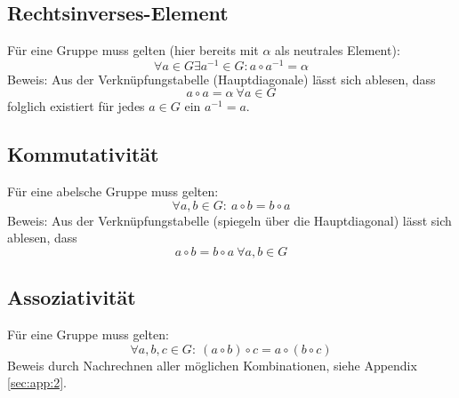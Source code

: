 \documentclass[DIN, pagenumber=false, fontsize=11pt, parskip=half]{scrartcl}
\begin{document}
    \subsection{Rechtsinverses-Element}
    Für eine Gruppe muss gelten (hier bereits mit $\alpha$ als neutrales Element):
    \begin{equation}
        \forall a \in G \exists a^{-1} \in G: a \circ a^{-1} = \alpha
    \end{equation}
    Beweis: Aus der Verknüpfungstabelle (Hauptdiagonale) lässt sich ablesen, dass 
    \begin{equation}
        a \circ a = \alpha\ \forall a \in G
    \end{equation}
    folglich existiert für jedes $a \in G$ ein $a^{-1} = a$.

    \subsection{Kommutativität}
    Für eine abelsche Gruppe muss gelten:
    \begin{equation}
        \forall a, b \in G:\ a \circ b = b \circ a
    \end{equation}    
    Beweis: Aus der Verknüpfungstabelle (spiegeln über die Hauptdiagonal) lässt sich
    ablesen, dass
    \begin{equation}
        a \circ b = b \circ a\ \forall a, b \in G
    \end{equation}

    \subsection{Assoziativität}
    Für eine Gruppe muss gelten:
    \begin{equation}
        \forall a, b, c \in G:\ (a \circ b) \circ c = a \circ (b \circ c)
    \end{equation}
    Beweis durch Nachrechnen aller möglichen Kombinationen, siehe Appendix
    \ref{sec:app:2}.
\end{document}
